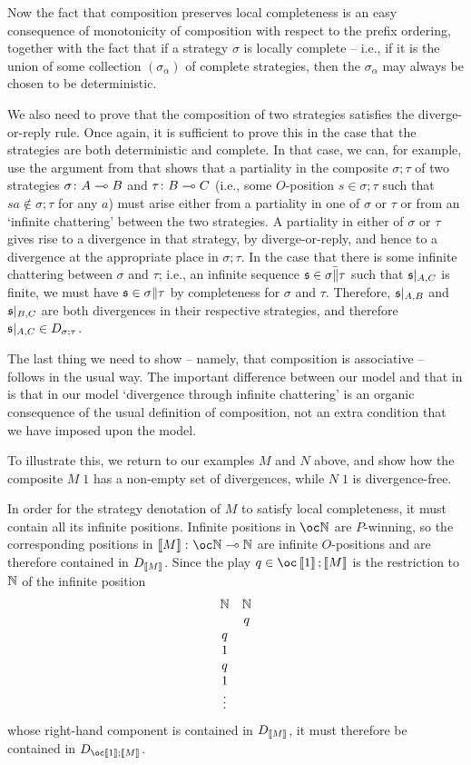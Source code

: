 \documentclass[sigplan,10pt,review]{acmart}\settopmatter{printfolios=true,printccs=false,printacmref=false}
\begin{document}
Now the fact that composition preserves local completeness is an easy consequence of monotonicity of composition with respect to the prefix ordering, together with the fact that if a strategy $\sigma$ is locally complete -- i.e., if it is the union of some collection $(\sigma_\alpha)$ of complete strategies, then the $\sigma_\alpha$ may always be chosen to be deterministic.

We also need to prove that the composition of two strategies satisfies the diverge-or-reply rule.  
Once again, it is sufficient to prove this in the case that the strategies are both deterministic and complete.  
In that case, we can, for example, use the argument from \cite{abramskyjagadeesangames} that shows that a partiality in the composite $\sigma;\tau$ of two strategies $\sigma\colon A\multimap B$ and $\tau\colon B\multimap C$ (i.e., some $O$-position $s\in\sigma;\tau$ such that $sa\not\in\sigma;\tau$ for any $a$) must arise either from a partiality in one of $\sigma$ or $\tau$ or from an `infinite chattering' between the two strategies.  
A partiality in either of $\sigma$ or $\tau$ gives rise to a divergence in that strategy, by diverge-or-reply, and hence to a divergence at the appropriate place in $\sigma;\tau$.  
In the case that there is some infinite chattering between $\sigma$ and $\tau$; i.e., an infinite sequence $\mathfrak s\in\bar{\sigma\|\tau}$ such that $\mathfrak s\vert_{A,C}$ is finite, we must have $\mathfrak s\in\sigma\|\tau$ by completeness for $\sigma$ and $\tau$.  
Therefore, $\mathfrak s\vert_{A,B}$ and $\mathfrak s\vert_{B,C}$ are both divergences in their respective strategies, and therefore $\mathfrak s\vert_{A,C}\in D_{\sigma;\tau}$.  

The last thing we need to show -- namely, that composition is associative -- follows in the usual way.  
The important difference between our model and that in \cite{mcCHFiniteND} is that in our model `divergence through infinite chattering' is an organic consequence of the usual definition of composition, not an extra condition that we have imposed upon the model.  

To illustrate this, we return to our examples $M$ and $N$ above, and show how the composite $M\;1$ has a non-empty set of divergences, while $N\;1$ is divergence-free.

In order for the strategy denotation of $M$ to satisfy local completeness, it must contain all its infinite positions.  
Infinite positions in $\oc \bN$ are $P$-winning, so the corresponding positions in $\deno{M}\from \oc \bN\implies \bN$ are infinite $O$-positions and are therefore contained in $D_{\left\llbracket M\right\rrbracket}$.  
Since the play $q\in \oc\deno{1};\deno{M}$ is the restriction to $\mathbb{N}$ of the infinite position
\[
  \begin{array}{cc}
    \mathbb{N} & \mathbb{N} \\
    & q \\
    q & \\
    1 & \\
    q & \\
    1 & \\
    \vdots &
  \end{array}
  \]
whose right-hand component is contained in $D_{\left\llbracket M\right\rrbracket}$, it must therefore be contained in $D_{\oc\deno{1};\deno{M}}$.
\end{document}

